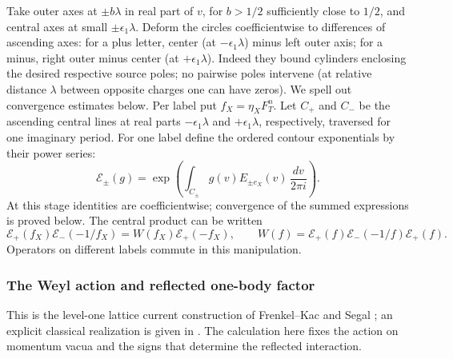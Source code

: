 Take outer axes at \(\pm b\lambda\) in real part of \(v\), for \(b>1/2\) sufficiently close to \(1/2\), and central axes at small \(\pm\epsilon_1\lambda\). Deform the circles coefficientwise to differences of ascending axes: for a plus letter, center (at \(-\epsilon_1\lambda\)) minus left outer axis; for a minus, right outer minus center (at \(+\epsilon_1\lambda\)). Indeed they bound cylinders enclosing the desired respective source poles; no pairwise poles intervene (at relative distance \(\lambda\) between opposite charges one can have zeros). We spell out convergence estimates below. Per label put \(f_X=\eta_X F_T^n\). Let \(C_+\) and \(C_-\) be the ascending central lines at real parts
\(-\epsilon_1\lambda\) and \(+\epsilon_1\lambda\), respectively,
traversed for one imaginary period. For one label define the ordered
contour exponentials by their power series:
\[
 \mathcal E_\pm(g)
 =\exp\!\left(\int_{C_\pm}g(v)E_{\pm e_X}(v)\,\frac{dv}{2\pi i}\right).
\]
At this stage identities are coefficientwise; convergence of the summed
expressions is proved below. The central product can be written
\[
 \mathcal E_+(f_X)\mathcal E_-(-1/f_X)
 =W(f_X)\mathcal E_+(-f_X),\qquad
 W(f)=\mathcal E_+(f)\mathcal E_-(-1/f)\mathcal E_+(f).
\]
Operators on different labels commute in this manipulation.

\subsubsection{The Weyl action and reflected one-body factor}
This is the level-one lattice current construction of
Frenkel--Kac and Segal \cite{FrenkelKac1980,Segal1981}; an explicit
classical realization is given in \cite[Section~2.1]{Frenkel1985}.
The calculation here fixes the action on momentum vacua and the signs
that determine the reflected interaction.

